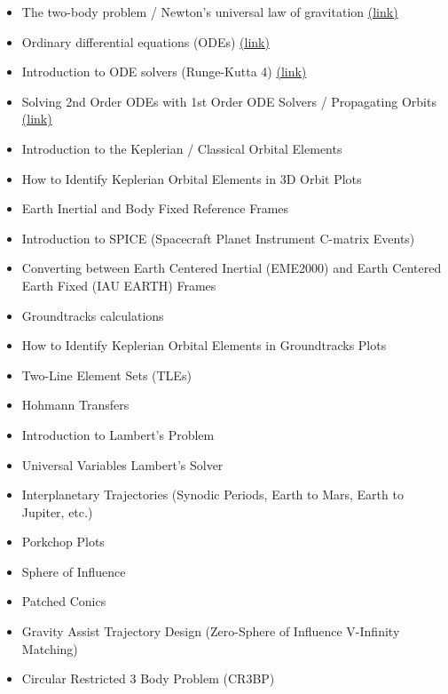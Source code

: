 \documentclass{article}
\begin{document}
\begin{itemize}
	\item The two-body problem / Newton's universal law of gravitation \color{cyan}\href{https://youtu.be/nJ_f1h49jfM}{(link)} \color{white}
	\item Ordinary differential equations (ODEs) \color{cyan}\href{https://youtu.be/8-SyHZb7w40}{(link)} \color{white}
	\item Introduction to ODE solvers (Runge-Kutta 4) \color{cyan}\href{https://youtu.be/VrH6JhIFmcA}{(link)} \color{white}
	\item Solving 2nd Order ODEs with 1st Order ODE Solvers / Propagating Orbits \color{cyan}\href{https://youtu.be/TzX6bg3Kc0E}{(link)} \color{white}
	\item Introduction to the Keplerian / Classical Orbital Elements
	\item How to Identify Keplerian Orbital Elements in 3D Orbit Plots
	\item Earth Inertial and Body Fixed Reference Frames
	\item Introduction to SPICE (Spacecraft Planet Instrument C-matrix Events)
	\item Converting between Earth Centered Inertial (EME2000) and Earth Centered Earth Fixed (IAU EARTH) Frames
	\item Groundtracks calculations
	\item How to Identify Keplerian Orbital Elements in Groundtracks Plots
	\item Two-Line Element Sets (TLEs)
	\item Hohmann Transfers
	\item Introduction to Lambert's Problem
	\item Universal Variables Lambert's Solver
	\item Interplanetary Trajectories (Synodic Periods, Earth to Mars, Earth to Jupiter, etc.)
	\item Porkchop Plots
	\item Sphere of Influence
	\item Patched Conics
	\item Gravity Assist Trajectory Design (Zero-Sphere of Influence V-Infinity Matching)
	\item Circular Restricted 3 Body Problem (CR3BP)
\end{itemize}
\end{document}
